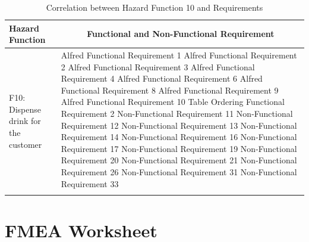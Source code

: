 \documentclass [10pt]{article}
\begin{document}
\begin{longtable}{| p{ } | p{ } |}
\hline 
\centering \textbf{Hazard Function} & 
\multicolumn{1}{c}{\textbf {Functional and Non-Functional Requirement}}\\ \hline
\multirow{18}{*}{F10: Dispense drink for the customer} & 
		{Alfred Functional Requirement 1 \newline
		Alfred Functional Requirement 2 \newline
		Alfred Functional Requirement 3 \newline
		Alfred Functional Requirement 4 \newline
		Alfred Functional Requirement 6 \newline
		Alfred Functional Requirement 8 \newline
		Alfred Functional Requirement 9 \newline
		Alfred Functional Requirement 10 \newline
		Table Ordering Functional Requirement 2 \newline
		Non-Functional Requirement 11 \newline
		Non-Functional Requirement 12 \newline
		Non-Functional Requirement 13 \newline
		Non-Functional Requirement 14 \newline
		Non-Functional Requirement 16 \newline
		Non-Functional Requirement 17 \newline
		Non-Functional Requirement 19 \newline
		Non-Functional Requirement 20 \newline
		Non-Functional Requirement 21 \newline
		Non-Functional Requirement 26 \newline
		Non-Functional Requirement 31 \newline
		Non-Functional Requirement 33} \\
\hline 
\caption{Correlation between Hazard Function 10 and Requirements}  
\end{longtable}

\pagebreak

\section{FMEA Worksheet}
\end{document}
